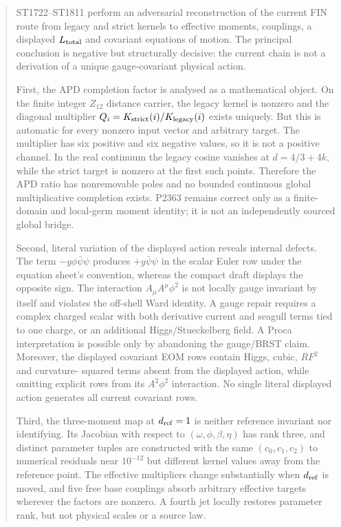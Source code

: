 \documentclass[11pt,a4paper]{article}
\begin{document}
\begin{abstract}
ST1722--ST1811 perform an adversarial reconstruction of the current FIN route
from legacy and strict kernels to effective moments, couplings, a displayed
$L_{\rm total}$ and covariant equations of motion.  The principal conclusion
is negative but structurally decisive: the current chain is not a derivation
of a unique gauge-covariant physical action.

First, the APD completion factor is analysed as a mathematical object.  On the
finite integer $Z_{12}$ distance carrier, the legacy kernel is nonzero and the
diagonal multiplier $Q_i=K_{\rm strict}(i)/K_{\rm legacy}(i)$ exists uniquely.
But this is automatic for every nonzero input vector and arbitrary target.
The multiplier has six positive and six negative values, so it is not a
positive channel.  In the real continuum the legacy cosine vanishes at
$d=4/3+4k$, while the strict target is nonzero at the first such points.
Therefore the APD ratio has nonremovable poles and no bounded continuous global
multiplicative completion exists.  P2363 remains correct only as a finite-
domain and local-germ moment identity; it is not an independently sourced
global bridge.

Second, literal variation of the displayed action reveals internal defects.
The term $-y\phi\bar\psi\psi$ produces $+y\bar\psi\psi$ in the scalar Euler row
under the equation sheet's convention, whereas the compact draft displays the
opposite sign.  The interaction $A_\mu A^\mu\phi^2$ is not locally gauge
invariant by itself and violates the off-shell Ward identity.  A gauge repair
requires a complex charged scalar with both derivative current and seagull
terms tied to one charge, or an additional Higgs/Stueckelberg field.  A Proca
interpretation is possible only by abandoning the gauge/BRST claim.  Moreover,
the displayed covariant EOM rows contain Higgs, cubic, $RF^2$ and curvature-
squared terms absent from the displayed action, while omitting explicit rows
from its $A^2\phi^2$ interaction.  No single literal displayed action generates
all current covariant rows.

Third, the three-moment map at $d_{\rm ref}=1$ is neither reference invariant
nor identifying.  Its Jacobian with respect to $(\omega,\phi,\beta,\eta)$ has
rank three, and distinct parameter tuples are constructed with the same
$(c_0,c_1,c_2)$ to numerical residuals near $10^{-12}$ but different kernel
values away from the reference point.  The effective multipliers change
substantially when $d_{\rm ref}$ is moved, and five free base couplings absorb
arbitrary effective targets wherever the factors are nonzero.  A fourth jet
locally restores parameter rank, but not physical scales or a source law.


\end{abstract}
\end{document}
